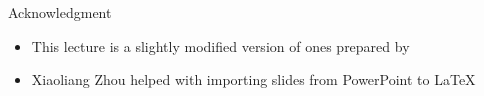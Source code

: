 \documentclass[11pt,aspectratio=169,handout]{beamer}
\begin{document}
  \begin{frame}{Acknowledgment}
   \begin{itemize}
   \setlength{\itemsep}{1em}
    \item This lecture is a slightly modified version of ones prepared by
    \item Xiaoliang Zhou helped with importing slides from PowerPoint to \LaTeX
   \end{itemize}
  \end{frame}
 
\end{document}
